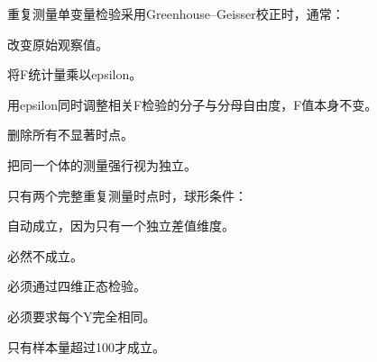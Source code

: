 \par\addvspace{6pt}\noindent\begin{minipage}{\linewidth}


重复测量单变量检验采用Greenhouse--Geisser校正时，通常：


\begin{choices}

\item 改变原始观察值。

\item 将F统计量乘以epsilon。

\item 用epsilon同时调整相关F检验的分子与分母自由度，F值本身不变。

\item 删除所有不显著时点。

\item 把同一个体的测量强行视为独立。

\end{choices}

\end{minipage}\par\vspace{4pt}

\par\addvspace{6pt}\noindent\begin{minipage}{\linewidth}


只有两个完整重复测量时点时，球形条件：


\begin{choices}

\item 自动成立，因为只有一个独立差值维度。

\item 必然不成立。

\item 必须通过四维正态检验。

\item 必须要求每个Y完全相同。

\item 只有样本量超过100才成立。

\end{choices}

\end{minipage}\par\vspace{4pt}

